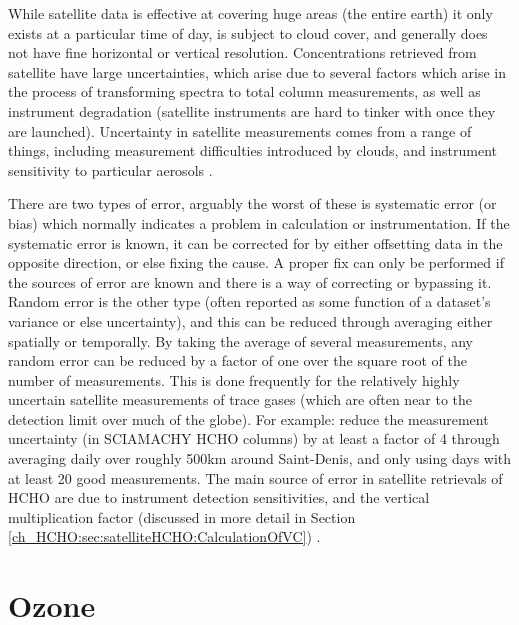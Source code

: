     While satellite data is effective at covering huge areas (the entire earth) it only exists at a particular time of day, is subject to cloud cover, and generally does not have fine horizontal or vertical resolution.
    Concentrations retrieved from satellite have large uncertainties, which arise due to several factors which arise in the process of transforming spectra to total column measurements, as well as instrument degradation (satellite instruments are hard to tinker with once they are launched).
    Uncertainty in satellite measurements comes from a range of things, including measurement difficulties introduced by clouds, and instrument sensitivity to particular aerosols \citep{Millet2006}.
    
    There are two types of error, arguably the worst of these is systematic error (or bias) which normally indicates a problem in calculation or instrumentation.
    If the systematic error is known, it can be corrected for by either offsetting data in the opposite direction, or else fixing the cause.
    A proper fix can only be performed if the sources of error are known and there is a way of correcting or bypassing it.
    Random error is the other type (often reported as some function of a dataset's variance or else uncertainty), and this can be reduced through averaging either spatially or temporally. 
    By taking the average of several measurements, any random error can be reduced by a factor of one over the square root of the number of measurements.
    This is done frequently for the relatively highly uncertain satellite measurements of trace gases (which are often near to the detection limit over much of the globe).
    For example: \citet{Vigouroux2009} reduce the measurement uncertainty (in SCIAMACHY HCHO columns) by at least a factor of 4 through averaging daily over roughly 500km around Saint-Denis, and only using days with at least 20 good measurements.
    The main source of error in satellite retrievals of HCHO are due to instrument detection sensitivities, and the vertical multiplication factor (discussed in more detail in Section \ref{ch_HCHO:sec:satelliteHCHO:CalculationOfVC}) \citep{Millet2006}.
    

\section{Ozone}
\label{ch_LitRev:sec:Ozone}
  
